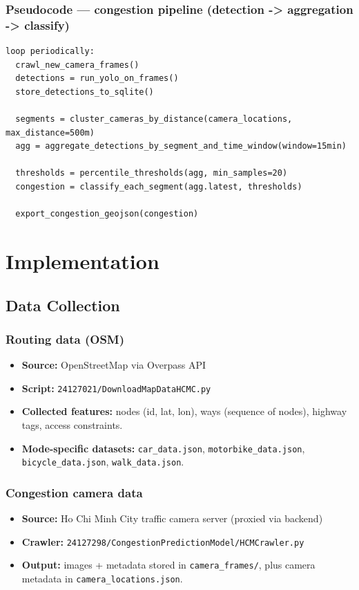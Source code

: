 \subsection{Pseudocode --- congestion pipeline (detection -> aggregation -> classify)}
\begin{verbatim}
loop periodically:
  crawl_new_camera_frames()
  detections = run_yolo_on_frames()
  store_detections_to_sqlite()

  segments = cluster_cameras_by_distance(camera_locations, max_distance=500m)
  agg = aggregate_detections_by_segment_and_time_window(window=15min)

  thresholds = percentile_thresholds(agg, min_samples=20)
  congestion = classify_each_segment(agg.latest, thresholds)

  export_congestion_geojson(congestion)
\end{verbatim}

\chapter{Implementation}
\label{chap:implementation}

\section{Data Collection}

\subsection{Routing data (OSM)}
\begin{itemize}
  \item \textbf{Source:} OpenStreetMap via Overpass API
  \item \textbf{Script:} \texttt{24127021/DownloadMapDataHCMC.py}
  \item \textbf{Collected features:} nodes (id, lat, lon), ways (sequence of nodes), highway tags, access constraints.
  \item \textbf{Mode-specific datasets:} \texttt{car\_data.json}, \texttt{motorbike\_data.json}, \texttt{bicycle\_data.json}, \texttt{walk\_data.json}.
\end{itemize}

\subsection{Congestion camera data}
\begin{itemize}
  \item \textbf{Source:} Ho Chi Minh City traffic camera server (proxied via backend)
  \item \textbf{Crawler:} \texttt{24127298/CongestionPredictionModel/HCMCrawler.py}
  \item \textbf{Output:} images + metadata stored in \texttt{camera\_frames/}, plus camera metadata in \texttt{camera\_locations.json}.
\end{itemize}


